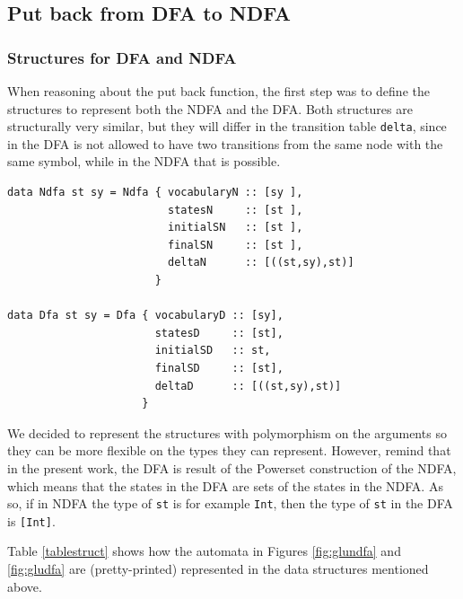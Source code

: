 \subsection{Put back from DFA to NDFA}

\subsubsection{Structures for DFA and NDFA}
When reasoning about the put back function, the first step was to define the structures to represent both the NDFA and the DFA. Both structures are structurally very similar, but they will differ in the transition table \texttt{delta}, since in the DFA is not allowed to have two transitions from the same node with the same symbol, while in the NDFA that is possible. 

\begin{verbatim}
data Ndfa st sy = Ndfa { vocabularyN :: [sy ],
                         statesN     :: [st ],
                         initialSN   :: [st ],
                         finalSN     :: [st ],
                         deltaN      :: [((st,sy),st)]
                       }
                   
data Dfa st sy = Dfa { vocabularyD :: [sy],
                       statesD     :: [st],
                       initialSD   :: st,
                       finalSD     :: [st],
                       deltaD      :: [((st,sy),st)]
                     }
\end{verbatim}

We decided to represent the structures with polymorphism on the arguments so they can be more flexible on the types they can represent. However, remind that in the present work, the DFA is result of the Powerset construction of the NDFA, which means that the states in the DFA are sets of the states in the NDFA. As so, if in NDFA the type of \texttt{st} is for example \texttt{Int}, then the type of \texttt{st} in the DFA is \texttt{[Int]}. 

Table \ref{tablestruct} shows how the automata in Figures \ref{fig:glundfa} and \ref{fig:gludfa} are (pretty-printed) represented in the data structures mentioned above.

